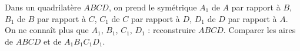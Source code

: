 Dans un quadrilatère $ABCD$, on prend le symétrique $A_1$ de $A$ par rapport à $B$, $B_1$ de $B$ par rapport à $C$, $C_1$ de $C$ par rapport à $D$, $D_1$ de $D$ par rapport à $A$. On ne connaît plus que $A_1$, $B_1$, $C_1$, $D_1$ : reconstruire $ABCD$. Comparer les aires de $ABCD$ et de $A_1B_1C_1D_1$.

